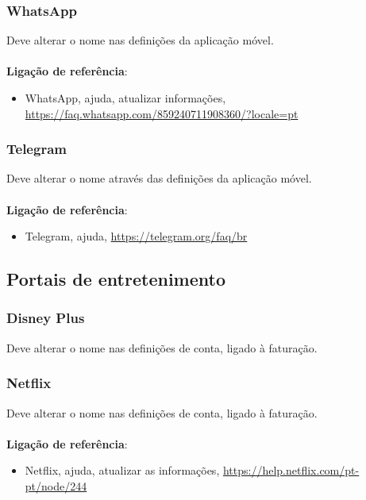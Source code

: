 \subsubsection{WhatsApp}

Deve alterar o nome nas definições da aplicação móvel. \\
\\
\textbf{Ligação de referência}:
\begin{itemize}
	\item WhatsApp, ajuda, atualizar informações, \url{https://faq.whatsapp.com/859240711908360/?locale=pt}
\end{itemize}

\subsubsection{Telegram}

Deve alterar o nome através das definições da aplicação móvel. \\
\\
\textbf{Ligação de referência}:
\begin{itemize}
	\item Telegram, ajuda, \url{https://telegram.org/faq/br}
\end{itemize}

\subsection{Portais de entretenimento}

\subsubsection{Disney Plus}

Deve alterar o nome nas definições de conta, ligado à faturação.

\subsubsection{Netflix}

Deve alterar o nome nas definições de conta, ligado à faturação. \\
\\
\textbf{Ligação de referência}:
\begin{itemize}
	\item Netflix, ajuda, atualizar as informações, \url{https://help.netflix.com/pt-pt/node/244}
\end{itemize}

